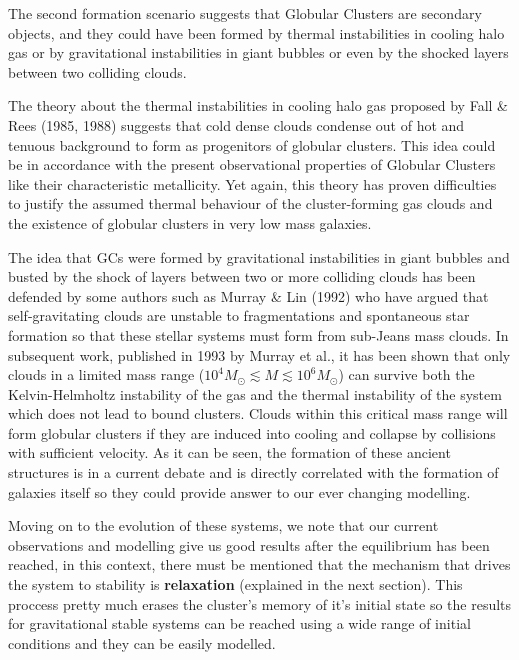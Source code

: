 The second formation scenario suggests that Globular Clusters are secondary objects, and they could have been formed by thermal instabilities in cooling halo gas or by gravitational instabilities in giant bubbles or even by the shocked layers between two colliding clouds. 

The theory about the thermal instabilities in cooling halo gas proposed by Fall \& Rees (1985, 1988)\cite{13}  suggests that cold dense clouds condense out of hot and tenuous background to form as progenitors of globular clusters. This idea could be in accordance with the present observational properties of Globular Clusters like their characteristic metallicity. Yet again, this theory has proven difficulties to justify the assumed thermal behaviour of the cluster-forming gas clouds and the existence of globular clusters in very low mass galaxies.

The idea that GCs were formed by gravitational instabilities in giant bubbles and busted by the shock of layers between two or more colliding clouds has been defended by some authors such as Murray \& Lin (1992) who have argued that self-gravitating clouds are unstable to fragmentations and spontaneous star formation so that these stellar systems must form from sub-Jeans mass clouds. In subsequent work, published in 1993 by Murray et al., it has been shown that only clouds in a limited mass range ($10^{4}M_\odot\lesssim M\lesssim 10^{6}M_\odot$) can survive both the Kelvin-Helmholtz instability of the gas and the thermal instability of the system which does not lead to bound clusters. Clouds within this critical mass range will form globular clusters if they are induced into cooling and collapse by collisions with sufficient velocity. As it can be seen, the formation of these ancient structures is in a current debate and is directly correlated with the formation of galaxies itself so they could provide answer to our ever changing modelling. 

Moving on to the evolution of these systems, we note that our current observations and modelling give us good results after the equilibrium has been reached, in this context, there must be mentioned that the mechanism that drives the system to stability is \textbf{relaxation} (explained in the next section). This proccess pretty much erases the cluster's memory of it's initial state so the results for gravitational stable systems can be reached using a wide range of initial conditions and they can be easily modelled.

